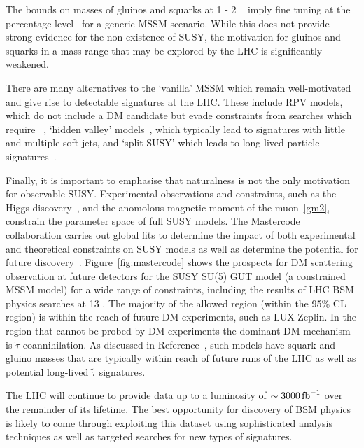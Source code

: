 The bounds on masses of gluinos and squarks at 1 - 2 \TeV~ imply fine
tuning at the percentage level~\cite{hmus} for a generic MSSM scenario. 
While this does not provide strong evidence for the non-existence of SUSY,
the motivation for gluinos and squarks in a mass range that may be explored 
by the LHC is significantly weakened.  

There are many alternatives to the `vanilla' MSSM which remain well-motivated 
and give rise to detectable signatures at the LHC. These include RPV models,
which do not include a DM candidate but evade constraints from searches which require \met~\cite{rpv}, 
`hidden valley' models~\cite{hValley}, which typically lead to signatures with little \met and multiple
soft jets, and `split SUSY' which leads to long-lived particle signatures~\cite{sSusy}.

Finally, it is important to emphasise that naturalness is not the only motivation
for observable SUSY. Experimental observations and constraints, such as the Higgs discovery~\cite{cmsHiggs,atlasHiggs},
and the anomolous magnetic moment of the muon~\ref{gm2}, constrain the parameter
space of full SUSY models. The Mastercode collaboration carries out global fits to determine 
the impact of both experimental and theoretical constraints on SUSY models as well 
as determine the potential for future discovery~\cite{mastercode}. 
Figure~\ref{fig:mastercode} shows the prospects for DM scattering observation at 
future detectors for the SUSY SU(5) GUT model (a constrained MSSM model) for a wide
range of constraints, including the results of LHC BSM physics searches at 13 \TeV.
The majority of the allowed region (within the 95\% CL region) 
is within the reach of future DM experiments,
such as LUX-Zeplin. In the region that cannot be probed by DM experiments
the dominant DM mechanism is $\tilde{\tau}$ coannihilation.
As discussed in Reference~\cite{mastercode}, such models have squark and gluino
masses that are typically within reach of future runs of the LHC
as well as potential long-lived $\tilde{\tau}$ signatures.

The LHC will continue to provide data up to a luminosity of $\sim 3000\,\text{fb}^{-1}$ over the 
remainder of its lifetime. The best opportunity for discovery of 
BSM physics is likely to come through exploiting this dataset 
using sophisticated analysis techniques as well as targeted searches 
for new types of signatures.

